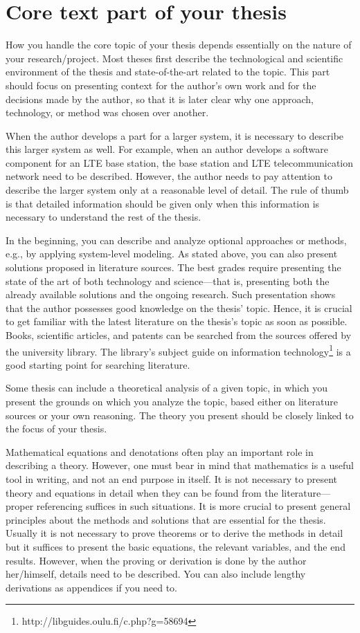 \section{Core text part of your thesis}

How you handle the core topic of your thesis depends essentially on the nature of your research/project. Most theses first describe the technological and scientific environment of the thesis and state-of-the-art related to the topic. This part should focus on presenting context for the author’s own work and for the decisions made by the author, so that it is later clear why one approach, technology, or method was chosen over another.

When the author develops a part for a larger system, it is necessary to describe this larger system as well. For example, when an author develops a software component for an LTE base station, the base station and LTE telecommunication network need to be described. However, the author needs to pay attention to describe the larger system only at a reasonable level of detail. The rule of thumb is that detailed information should be given only when this information is necessary to understand the rest of the thesis.

In the beginning, you can describe and analyze optional approaches or methods, e.g., by applying system-level modeling. As stated above, you can also present solutions proposed in literature sources. The best grades require presenting the state of the art of both technology and science---that is, presenting both the already available solutions and the ongoing research. Such presentation shows that the author possesses good knowledge on the thesis’ topic. Hence, it is crucial to get familiar with the latest literature on the thesis’s topic as soon as possible. Books, scientific articles, and patents can be searched from the sources offered by the university library. The library’s subject guide on information technology\footnote{ http://libguides.oulu.fi/c.php?g=58694} is a good starting point for searching literature.

Some thesis can include a theoretical analysis of a given topic, in which you present the grounds on which you analyze the topic, based either on literature sources or your own reasoning.  The theory you present should be closely linked to the focus of your thesis.

Mathematical equations and denotations often play an important role in describing a theory. However, one must bear in mind that mathematics is a useful tool in writing, and not an end purpose in itself. It is not necessary to present theory and equations in detail when they can be found from the literature---proper referencing suffices in such situations. It is more crucial to present general principles about the methods and solutions that are essential for the thesis. Usually it is not necessary to prove theorems or to derive the methods in detail but it suffices to present the basic equations, the relevant variables, and the end results. However, when the proving or derivation is done by the author her/himself, details need to be described. You can also include lengthy derivations as appendices if you need to.

